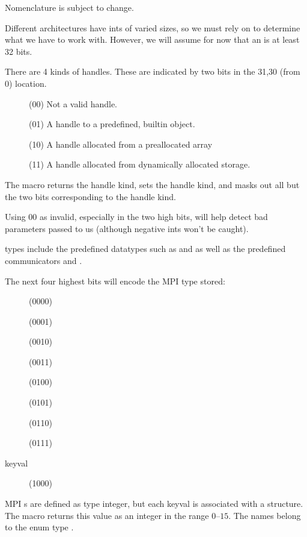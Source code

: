 \documentclass{article}
\begin{document}
Nomenclature is subject to change.

Different architectures have ints of varied sizes, so we must rely on
 to determine what we have to work with.  However,
we will assume for now that an  is at least 32 bits.

There are 4 kinds of handles.  These are indicated by two bits in the
31,30 (from 0) location.
\begin{description}
\item[] (00) Not a valid handle.
\item[] (01) A handle to a predefined,
builtin object. 
\item[] (10) A handle allocated from a
preallocated array 
\item[] (11) A handle allocated from dynamically
allocated storage.
\end{description}
The macro  returns the handle kind,
 sets the handle kind, and
 masks out all but the two bits
corresponding to the handle kind.


Using $00$ as invalid, especially in the two high bits, will help detect
bad parameters passed to us (although negative ints won't be caught).

 types include the predefined datatypes such as
 and  as well as the predefined communicators
 and .

The next four highest bits will encode the MPI type stored:
\begin{description}
\item[]     (0000) 
\item[]    (0001) 
\item[] (0010) 
\item[]     (0011) 
\item[](0100) 
\item[]       (0101) 
\item[]     (0110) 
\item[]      (0111) 
\item[keyval]              (1000) 
\end{description}
MPI s are defined as type integer, but each keyval is associated
with a structure.  
The macro  returns this value as an integer in
the range $0$--$15$.  The names belong to the enum type
. 
\end{document}
